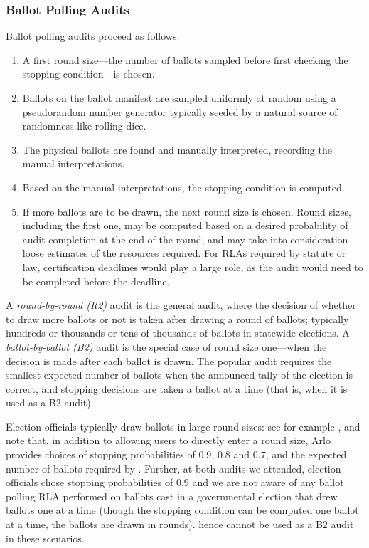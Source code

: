 \subsubsection{Ballot Polling Audits}
Ballot polling audits proceed as follows. 
\begin{enumerate}
\item A first round \cite{usenix_minerva} size---the number of ballots sampled before first checking the stopping condition---is chosen. 
\item Ballots on the ballot manifest are sampled uniformly at random using a pseudorandom number generator typically seeded by a natural source of randomness like rolling dice.
\item The physical ballots are found and manually interpreted, recording the manual interpretations. 
\item Based on the manual interpretations, the stopping condition is computed. 
\item If more ballots are to be drawn, the next round size is chosen. Round sizes, including the first one, may be computed based on a desired probability of audit completion at the end of the round, and may take into consideration loose estimates of the resources required. For RLAs required by statute or law, certification deadlines would play a large role, as the audit would need to be completed before the deadline. 
\end{enumerate} 

A {\em round-by-round (R2)} audit is the general audit, where the decision of whether to draw more ballots or not is taken after drawing a round of ballots; typically hundreds or thousands or tens of thousands of ballots in statewide elections. A {\em ballot-by-ballot (B2)} audit is the special case of round size one---when the decision is made after each ballot is drawn. The popular \BRAVO audit requires the smallest expected number of ballots when the announced tally of the election is correct, and stopping decisions are taken a ballot at a time (that is, when it is used as a B2 audit). 

Election officials typically draw ballots in large round sizes:  see for example \cite{va-2022,RI-report}, and note that, in addition to allowing users to directly enter a round size, Arlo provides choices of stopping probabilities of $0.9$, $0.8$ and $0.7$, and the expected number of ballots required by \BRAVO. Further, at both audits we attended, election officials chose stopping probabilities of $0.9$ and we are not aware of any ballot polling RLA performed on ballots cast in a governmental election that drew ballots one at a time (though the stopping condition can be computed one ballot at a time, the ballots are drawn in rounds). \BRAVO hence cannot be used as a B2 audit in these scenarios. 

